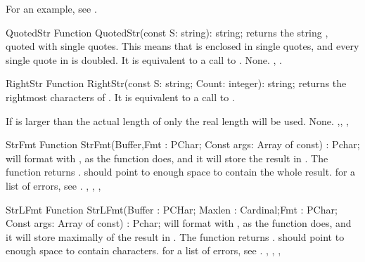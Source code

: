 For an example, see .
 
\begin{function}{QuotedStr}
\Declaration
Function QuotedStr(const S: string): string;
\Description
{} returns the string , quoted with single quotes. This means
that  is enclosed in single quotes, and every single quote in  
is doubled. It is equivalent to a call to .
\Errors
None.
\SeeAlso
{}, .
\end{function}


 
 
\begin{function}{RightStr}
\Declaration
Function RightStr(const S: string; Count: integer): string;
\Description
{} returns the  rightmost characters of .
It is equivalent to a call to .

If  is larger than the actual length of  only the real
length will be used.
\Errors
None.
\SeeAlso
{},, , 
\end{function}


 
\begin{function}{StrFmt}
\Declaration
Function StrFmt(Buffer,Fmt : PChar; Const args: Array of const) : Pchar;
\Description
{} will format  with , as the  
function does, and it will store the result in . The function
returns .  should point to enough space to contain
the whole result.
\Errors
for a list of errors, see .
\SeeAlso
{}, , , 
\end{function}


 
\begin{function}{StrLFmt}
\Declaration
Function StrLFmt(Buffer : PCHar; Maxlen : Cardinal;Fmt : PChar; Const args: Array of const) : Pchar;
\Description
{} will format  with , as the  
function does, and it will store maximally  of the 
result in . The function returns .  
should point to enough space to contain  characters.
\Errors
for a list of errors, see .
\SeeAlso
{}, , , 
\end{function}


